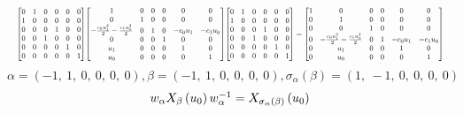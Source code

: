 \documentclass[11pt]{article}
\theoremstyle{definition}
\begin{document}
\[
\scaletoalign{\textwidth}{{\left[\begin{matrix}0 & 1 & 0 & 0 & 0 & 0\\1 & 0 & 0 & 0 & 0 & 0\\0 & 0 & 0 & 1 & 0 & 0\\0 & 0 & 1 & 0 & 0 & 0\\0 & 0 & 0 & 0 & 1 & 0\\0 & 0 & 0 & 0 & 0 & 1\end{matrix}\right]} {\left[\begin{matrix}1 & 0 & 0 & 0 & 0 & 0\\0 & 1 & 0 & 0 & 0 & 0\\- \frac{c_{0} u_{1}^{2}}{2} - \frac{c_{1} u_{0}^{2}}{2} & 0 & 1 & 0 & - c_{0} u_{1} & - c_{1} u_{0}\\0 & 0 & 0 & 1 & 0 & 0\\u_{1} & 0 & 0 & 0 & 1 & 0\\u_{0} & 0 & 0 & 0 & 0 & 1\end{matrix}\right]} {\left[\begin{matrix}0 & 1 & 0 & 0 & 0 & 0\\1 & 0 & 0 & 0 & 0 & 0\\0 & 0 & 0 & 1 & 0 & 0\\0 & 0 & 1 & 0 & 0 & 0\\0 & 0 & 0 & 0 & 1 & 0\\0 & 0 & 0 & 0 & 0 & 1\end{matrix}\right]} = {\left[\begin{matrix}1 & 0 & 0 & 0 & 0 & 0\\0 & 1 & 0 & 0 & 0 & 0\\0 & 0 & 1 & 0 & 0 & 0\\0 & - \frac{c_{0} u_{1}^{2}}{2} - \frac{c_{1} u_{0}^{2}}{2} & 0 & 1 & - c_{0} u_{1} & - c_{1} u_{0}\\0 & u_{1} & 0 & 0 & 1 & 0\\0 & u_{0} & 0 & 0 & 0 & 1\end{matrix}\right]}}
\]
\[
\alpha = \left( -1, \  1, \  0, \  0, \  0, \  0\right), \beta = \left( -1, \  1, \  0, \  0, \  0, \  0\right), \sigma_{\alpha}(\beta) = \left( 1, \  -1, \  0, \  0, \  0, \  0\right)
\]
\[
\scaletoalign{\textwidth}{w_{\alpha} X_{\beta}\left(u_{0}\right) w_{\alpha}^{-1} = X_{\sigma_{\alpha}\left(\beta\right)}\left(u_{0}\right)}
\]
\end{document}
